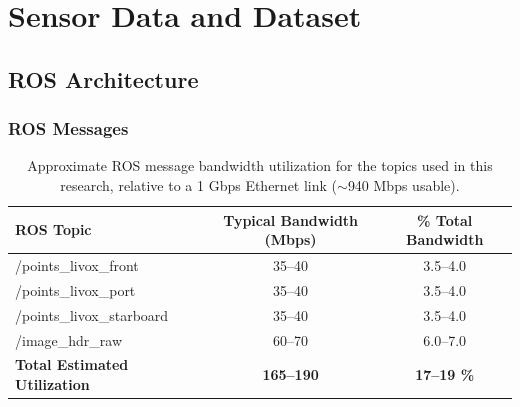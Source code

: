 \documentclass{erauthesis}
\begin{document}




\chapter{Sensor Data and Dataset} \label{dataset}

\section{ROS Architecture} \label{ROS_architechture}

\subsection{ROS Messages} \label{ROS_mesages}

\begin{table}[htbp]
\centering
\begin{tabular}{lcc}
\hline
ROS Topic & Typical Bandwidth (Mbps) & \% Total Bandwidth \\
\hline
/points\_livox\_front & 35--40 & 3.5--4.0 \\
/points\_livox\_port  & 35--40 & 3.5--4.0 \\
/points\_livox\_starboard & 35--40 & 3.5--4.0 \\
/image\_hdr\_raw  & 60--70 & 6.0--7.0 \\
\hline
\textbf{Total Estimated Utilization} & \textbf{165--190} & \textbf{17--19 \%} \\
\hline
\end{tabular}
\label{table:ROS_bandwidth}
\caption{Approximate \ac{ROS} message bandwidth utilization for the topics used in this research, relative to a 1 Gbps Ethernet link ($\sim$940 Mbps usable).}
\end{table}
\end{document}
